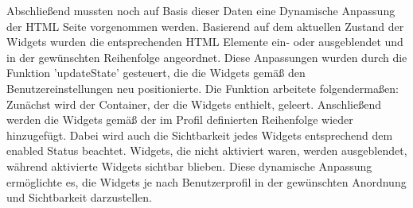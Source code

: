 Abschließend mussten noch auf Basis dieser Daten eine Dynamische Anpassung der HTML Seite vorgenommen werden.  Basierend auf dem aktuellen Zustand der Widgets wurden die entsprechenden HTML Elemente ein- oder ausgeblendet und in der gewünschten Reihenfolge angeordnet. Diese Anpassungen wurden durch die Funktion 'updateState' gesteuert, die die Widgets gemäß den Benutzereinstellungen neu positionierte. Die Funktion arbeitete folgendermaßen: Zunächst wird der Container, der die Widgets enthielt, geleert. Anschließend werden die Widgets gemäß der im Profil definierten Reihenfolge wieder hinzugefügt. Dabei wird auch die Sichtbarkeit jedes Widgets entsprechend dem enabled Status beachtet. Widgets, die nicht aktiviert waren, werden ausgeblendet, während aktivierte Widgets sichtbar blieben. Diese dynamische Anpassung ermöglichte es, die Widgets je nach Benutzerprofil in der gewünschten Anordnung und Sichtbarkeit darzustellen.

